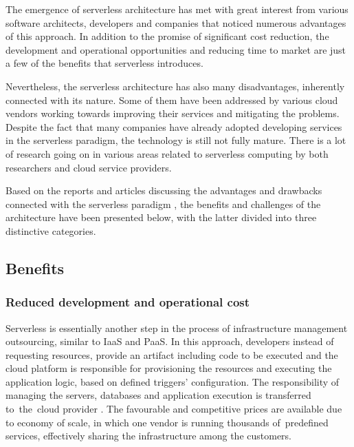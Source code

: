 The emergence of serverless architecture has met with great interest from various software architects, developers and companies that noticed numerous advantages of this approach. In addition to the promise of significant cost reduction, the development and operational opportunities and reducing time to market are just a few of the benefits that serverless introduces.

Nevertheless, the serverless architecture has also many disadvantages, inherently connected with its nature. Some of them have been addressed by various cloud vendors working towards improving their services and mitigating the problems. Despite the fact that many companies have already adopted developing services in the serverless paradigm, the technology is still not fully mature. There is a lot of research going on in various areas related to serverless computing by both researchers and cloud service providers.

Based on the reports and articles discussing the advantages and drawbacks connected with the serverless paradigm \cite{MartinFowlerServerless} \cite{BerkeleyServerless} \cite{ServerlessComputingSurveyOfOpportunitiesChallengesApplications} \cite{LeveragingServerlessCloudComputingArchitectures}, the benefits and challenges of the architecture have been presented below, with the latter divided into three distinctive categories.

\subsection{Benefits}

\subsubsection{Reduced development and operational cost} \label{chapter:serverless-reduced-development-and-operational-cost}

Serverless is essentially another step in the process of infrastructure management outsourcing, similar to IaaS and PaaS. In this approach, developers instead of requesting resources, provide an artifact including code to be executed and the cloud platform is responsible for provisioning the resources and executing the application logic, based on defined triggers' configuration. The responsibility of managing the servers, databases and application execution is transferred to~the~cloud provider \cite{BerkeleyServerless}. The favourable and competitive prices are available due to economy of scale, in which one vendor is running thousands of~predefined services, effectively sharing the infrastructure among the customers.

